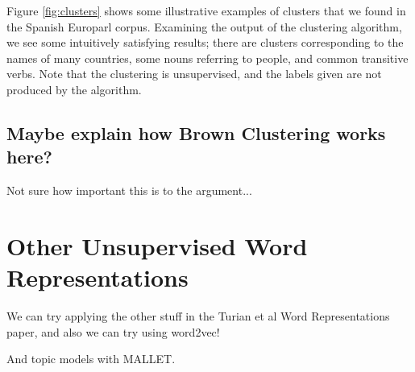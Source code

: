 Figure \ref{fig:clusters} shows some illustrative examples of clusters that
we found in the Spanish Europarl corpus.  Examining the output of the
clustering algorithm, we see some intuitively satisfying results; there are
clusters corresponding to the names of many countries, some nouns referring to
people, and common transitive verbs. Note that the clustering is unsupervised,
and the labels given are not produced by the algorithm.

\subsection{Maybe explain how Brown Clustering works here?}
Not sure how important this is to the argument...


\section{Other Unsupervised Word Representations}
We can try applying the other stuff in the Turian et al Word Representations
paper, and also we can try using word2vec!

And topic models with MALLET.
